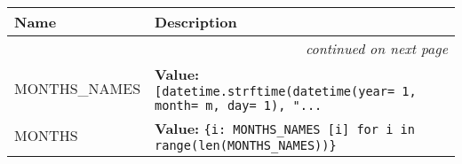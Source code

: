     \vspace{-1cm}
\hspace{\varindent}\begin{longtable}{|p{\varnamewidth}|p{\vardescrwidth}|l}
\cline{1-2}
\cline{1-2} \centering \textbf{Name} & \centering \textbf{Description}& \\
\cline{1-2}
\endhead\cline{1-2}\multicolumn{3}{r}{\small\textit{continued on next page}}\\\endfoot\cline{1-2}
\endlastfoot\raggedright M\-O\-N\-T\-H\-S\-\_\-N\-A\-M\-E\-S\- & \raggedright \textbf{Value:} 
{\tt [datetime.strftime(datetime(year= 1, month= m, day= 1), "\texttt{...}}&\\
\cline{1-2}
\raggedright M\-O\-N\-T\-H\-S\- & \raggedright \textbf{Value:} 
{\tt \{i: MONTHS\_NAMES [i] for i in range(len(MONTHS\_NAMES))\}}&\\
\cline{1-2}
\end{longtable}

